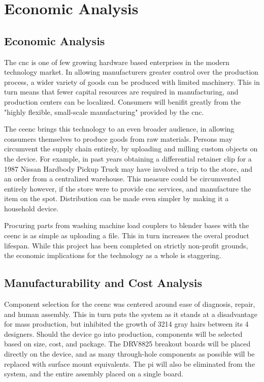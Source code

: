 \chapter{Economic Analysis}
\section{Economic Analysis}
The \gls{cnc} is one of few growing hardware based enterprises in the modern technology market.
In allowing manufacturers greater control over the production process, a wider variety of goods can be produced with limited machinery.
This in turn means that fewer capital resources are required in manufacturing, and production centers can be localized.
Consumers will benifit greatly from the "highly flexible, small-scale manufacturing"\cite{3dprintimpact} provided by the \gls{cnc}.

The \gls{ceenc} brings this technology to an even broader audience, in allowing consumers themselves to produce goods from raw materials.
Persons may circumvent the supply chain entirely, by uploading and milling custom objects on the device.\cite{3dprintsave}
For example, in past years obtaining a differential retainer clip for a 1987 Nissan Hardbody Pickup Truck may have involved a trip to the store, and an order from a centralized warehouse.
This measure could be circumvented entirely however, if the store were to provide \gls{cnc} services, and manufacture the item on the spot. 
Distribution can be made even simpler by making it a household device.

Procuring parts from washing machine load couplers to blender bases with the \gls{ceenc} is as simple as uploading a file.
This in turn increases the overal product lifespan.
While this project has been completed on strictly non-profit grounds, the economic implications for the technology as a whole is staggering.

\section{Manufacturability and Cost Analysis}
Component selection for the \gls{ceenc} was centered around ease of diagnosis, repair, and human assembly.
This in turn puts the system as it stands at a disadvantage for mass production, but inhibited the growth of 3214 gray hairs between its 4 designers.
Should the device go into production, components will be selected based on size, cost, and package. 
The DRV8825 breakout boards will be placed directly on the device, and as many through-hole components as possible will be replaced with surface mount equivalents.
The \gls{pi} will also be eliminated from the system, and the entire assembly placed on a single board.

